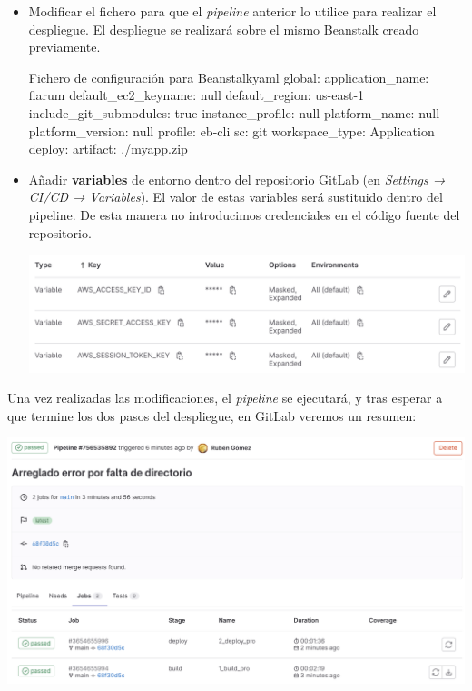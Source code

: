 \documentclass{\ClassPath/viu-tfm-template}
\begin{document}
\begin{itemize}
    \item Modificar el fichero  para que el \textit{pipeline} anterior lo utilice para realizar el despliegue. El despliegue se realizará sobre el mismo Beanstalk creado previamente.

    \begin{mycode}{Fichero de configuración para Beanstalk}{yaml}{}
global:
  application_name: flarum
  default_ec2_keyname: null
  default_region: us-east-1
  include_git_submodules: true
  instance_profile: null
  platform_name: null
  platform_version: null
  profile: eb-cli
  sc: git
  workspace_type: Application
deploy:
  artifact: ./myapp.zip\end{mycode}

    \item Añadir \textbf{variables} de entorno dentro del repositorio GitLab (en \textit{Settings → CI/CD → Variables}). El valor de estas variables será sustituido dentro del pipeline. De esta manera no introducimos credenciales en el código fuente del repositorio.
    \begin{center}
        \includegraphics[frame,width=\linewidth]{img/gitlab-vars.png}
    \end{center}
\end{itemize}

Una vez realizadas las modificaciones, el \textit{pipeline} se ejecutará, y tras esperar a que termine los dos pasos del despliegue, en GitLab veremos un resumen:

\begin{center}
    \includegraphics[frame,width=\linewidth]{img/gitlab-pipeline.png}
\end{center}
\end{document}
